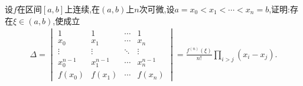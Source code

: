 \documentclass[lang=cn,newtx,10pt,scheme=chinese]{../Template/elegantbook}
\begin{document}
\begin{exercise}
    设\(f\)在区间\([a, b]\)上连续,在\((a, b)\)上\(n\)次可微,设\(a = x_0 < x_1 < \cdots < x_n = b\),证明:存在\(\xi \in (a, b)\),使成立
    \begin{align}
    \Delta = 
    \begin{vmatrix}
    1 & 1 & \cdots & 1 \\
    x_0 & x_1 & \cdots & x_n \\
    \vdots & \vdots & \ddots & \vdots \\
    x_0^{n-1} & x_1^{n-1} & \cdots & x_n^{n-1} \\
    f(x_0) & f(x_1) & \cdots & f(x_n)
    \end{vmatrix}
    = \frac{f^{(n)}(\xi)}{n!} \prod_{i > j} (x_i - x_j).
    \nonumber
    \end{align}
\end{exercise}
\end{document}
